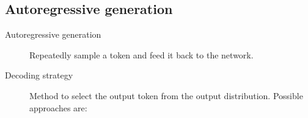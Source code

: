 \subsection{Autoregressive generation}

\begin{description}
    \item[Autoregressive generation] 
        Repeatedly sample a token and feed it back to the network.

    \item[Decoding strategy] 
        Method to select the output token from the output distribution. Possible approaches are:
\end{description}
